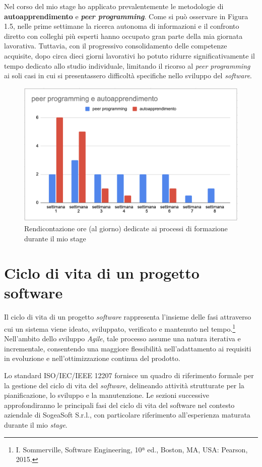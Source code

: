         \noindent Nel corso del mio stage ho applicato prevalentemente le metodologie di \textbf{autoapprendimento} e \textit{\textbf{peer programming}}. Come si può osservare in Figura 1.5, nelle prime settimane la ricerca autonoma di informazioni e il confronto diretto con colleghi più esperti hanno occupato gran parte della mia giornata lavorativa. Tuttavia, con il progressivo consolidamento delle competenze acquisite, dopo circa dieci giorni lavorativi ho potuto ridurre significativamente il tempo dedicato allo studio individuale, limitando il ricorso al \textit{peer programming} ai soli casi in cui si presentassero difficoltà specifiche nello sviluppo del \textit{software}.

        \begin{figure} [H]
            \centering
            \includegraphics[width=0.8\linewidth]{BCS-Tessi/images/Ore_formazione.png}
            \caption{Rendicontazione ore (al giorno) dedicate ai processi di formazione durante il mio stage}
            \label{fig:Ore-formazione}
        \end{figure}
        

    \section{Ciclo di vita di un progetto software}
    Il ciclo di vita di un progetto \textit{software} rappresenta l’insieme delle fasi attraverso cui un sistema viene ideato, sviluppato, verificato e mantenuto nel tempo.\footnote{I. Sommerville, Software Engineering, 10ª ed., Boston, MA, USA: Pearson, 2015.} Nell’ambito dello sviluppo \textit{Agile}, tale processo assume una natura iterativa e incrementale, consentendo una maggiore flessibilità nell’adattamento ai requisiti in evoluzione e nell’ottimizzazione continua del prodotto.
    
    \noindent Lo standard ISO/IEC/IEEE 12207 fornisce un quadro di riferimento formale per la gestione del ciclo di vita del \textit{software}, delineando attività strutturate per la pianificazione, lo sviluppo e la manutenzione. Le sezioni successive approfondiranno le principali fasi del ciclo di vita del software nel contesto aziendale di SogeaSoft S.r.l., con particolare riferimento all’esperienza maturata durante il mio \textit{stage}.
